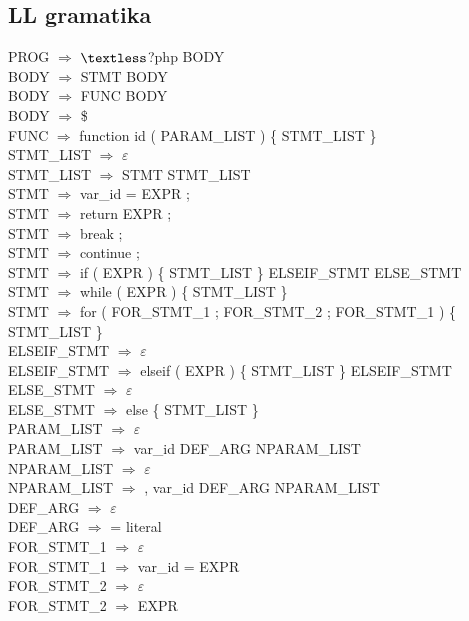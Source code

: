 \documentclass[12pt,a4paper,titlepage,final]{article}
\begin{document}
\subsection{LL gramatika}
PROG $\Rightarrow$ $\textless$?php BODY\\
BODY $\Rightarrow$ STMT BODY\\
BODY $\Rightarrow$ FUNC BODY\\
BODY $\Rightarrow$ \$\\
FUNC $\Rightarrow$ function id ( PARAM\_LIST ) \{ STMT\_LIST \}\\
STMT\_LIST $\Rightarrow$ $\varepsilon$\\
STMT\_LIST $\Rightarrow$ STMT STMT\_LIST\\
STMT $\Rightarrow$ var\_id = EXPR ;\\
STMT $\Rightarrow$ return EXPR ;\\
STMT $\Rightarrow$ break ;\\
STMT $\Rightarrow$ continue ;\\
STMT $\Rightarrow$ if ( EXPR ) \{ STMT\_LIST \} ELSEIF\_STMT ELSE\_STMT\\
STMT $\Rightarrow$ while ( EXPR ) \{ STMT\_LIST \}\\
STMT $\Rightarrow$ for ( FOR\_STMT\_1 ; FOR\_STMT\_2 ; FOR\_STMT\_1 ) \{ STMT\_LIST \}\\
ELSEIF\_STMT $\Rightarrow$ $\varepsilon$\\
ELSEIF\_STMT $\Rightarrow$ elseif ( EXPR ) \{ STMT\_LIST \} ELSEIF\_STMT\\
ELSE\_STMT $\Rightarrow$ $\varepsilon$\\
ELSE\_STMT $\Rightarrow$ else \{ STMT\_LIST \}\\
PARAM\_LIST $\Rightarrow$ $\varepsilon$\\
PARAM\_LIST $\Rightarrow$ var\_id DEF\_ARG NPARAM\_LIST\\
NPARAM\_LIST $\Rightarrow$ $\varepsilon$\\
NPARAM\_LIST $\Rightarrow$ , var\_id DEF\_ARG NPARAM\_LIST\\
DEF\_ARG $\Rightarrow$ $\varepsilon$\\
DEF\_ARG $\Rightarrow$ = literal\\
FOR\_STMT\_1 $\Rightarrow$ $\varepsilon$\\
FOR\_STMT\_1 $\Rightarrow$ var\_id = EXPR\\
FOR\_STMT\_2 $\Rightarrow$ $\varepsilon$\\
FOR\_STMT\_2 $\Rightarrow$ EXPR\\
\end{document}
